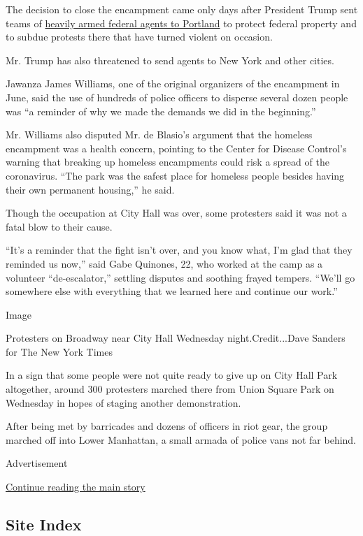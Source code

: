 The decision to close the encampment came only days after President
Trump sent teams of
\href{https://www.nytimes3xbfgragh.onion/2020/07/21/us/portland-protests.html}{heavily
armed federal agents to Portland} to protect federal property and to
subdue protests there that have turned violent on occasion.

Mr. Trump has also threatened to send agents to New York and other
cities.

Jawanza James Williams, one of the original organizers of the encampment
in June, said the use of hundreds of police officers to disperse several
dozen people was ``a reminder of why we made the demands we did in the
beginning.''

Mr. Williams also disputed Mr. de Blasio's argument that the homeless
encampment was a health concern, pointing to the Center for Disease
Control's warning that breaking up homeless encampments could risk a
spread of the coronavirus. ``The park was the safest place for homeless
people besides having their own permanent housing,'' he said.

Though the occupation at City Hall was over, some protesters said it was
not a fatal blow to their cause.

``It's a reminder that the fight isn't over, and you know what, I'm glad
that they reminded us now,'' said Gabe Quinones, 22, who worked at the
camp as a volunteer ``de-escalator,'' settling disputes and soothing
frayed tempers. ``We'll go somewhere else with everything that we
learned here and continue our work.''

Image

Protesters on Broadway near City Hall Wednesday night.Credit...Dave
Sanders for The New York Times

In a sign that some people were not quite ready to give up on City Hall
Park altogether, around 300 protesters marched there from Union Square
Park on Wednesday in hopes of staging another demonstration.

After being met by barricades and dozens of officers in riot gear, the
group marched off into Lower Manhattan, a small armada of police vans
not far behind.

Advertisement

\protect\hyperlink{after-bottom}{Continue reading the main story}

\hypertarget{site-index}{%
\subsection{Site Index}\label{site-index}}

